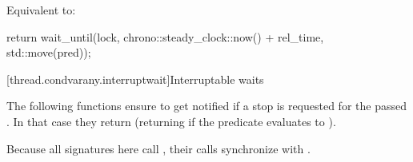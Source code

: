 \begin{itemdescr}
\pnum
\effects Equivalent to:
\begin{codeblock}
return wait_until(lock, chrono::steady_clock::now() + rel_time, std::move(pred));
\end{codeblock}
\end{itemdescr}



\clearpage

{\color{insertcolor}


[thread.condvarany.interruptwait]{Interruptable waits}

The following functions ensure to get notified
if a stop is requested for the passed .
In that case they return
(returning  if the predicate evaluates to ). 
\begin{note} 
        Because all signatures here call
        , their calls synchronize with .
      \end{note}




}
